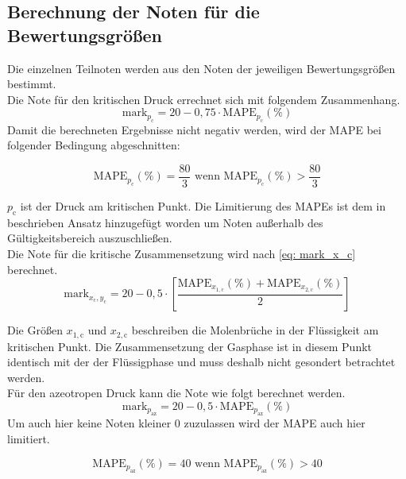\documentclass[../thesis.tex]{subfiles}
\begin{document}
\subsection{Berechnung der Noten für die Bewertungsgrößen}
Die einzelnen Teilnoten werden aus den Noten der jeweiligen Bewertungsgrößen bestimmt.
\\

Die Note für den kritischen Druck errechnet sich mit folgendem Zusammenhang.
\begin{equation}
	\mathrm{mark}_{p_{\mathrm{c}}} = 20 - 0,75 \cdot \mathrm{MAPE}_{p_\mathrm{c}}(\%)
\end{equation}
Damit die berechneten Ergebnisse nicht negativ werden, wird der MAPE bei folgender Bedingung abgeschnitten:

\begin{equation}
	\mathrm{MAPE}_{p_\mathrm{c}}(\%) = \dfrac{80}{3} \text{ wenn } \mathrm{MAPE}_{p_\mathrm{c}}(\%) > \dfrac{80}{3}
\end{equation}

$ p_\mathrm{c} $ ist der Druck am kritischen Punkt. Die Limitierung des MAPEs ist dem in \cite{jaubert2020benchmark} beschrieben Ansatz hinzugefügt worden um Noten außerhalb des Gültigkeitsbereich auszuschließen.
\\

Die Note für die kritische Zusammensetzung wird nach \autoref{eq: mark_x_c} berechnet.
\begin{equation}
\label{eq: mark_x_c}
\mathrm{mark}_{x_\mathrm{c},y_\mathrm{c}} = 20 - 0,5 \cdot \left[
	\dfrac{\mathrm{MAPE}_{x_{1,\mathrm{c}}}(\%) + \mathrm{MAPE}_{x_{2,\mathrm{c}}}(\%)}{2}
\right]
\end{equation}

Die Größen $ x_{1,\mathrm{c}} $ und $ x_{2,\mathrm{c}} $ beschreiben die Molenbrüche in der Flüssigkeit am kritischen Punkt. Die Zusammensetzung der Gasphase ist in diesem Punkt identisch mit der der Flüssigphase und muss deshalb nicht gesondert betrachtet werden.
\\

Für den azeotropen Druck kann die Note wie folgt berechnet werden.
\begin{equation}
	\mathrm{mark}_{p_{\mathrm{az}}} = 20 - 0,5 \cdot \mathrm{MAPE}_{p_\mathrm{az}}(\%)
\end{equation}
Um auch hier keine Noten kleiner 0 zuzulassen wird der MAPE auch hier limitiert.

\begin{equation}
	\label{eq: pheq_x_lim}
	\mathrm{MAPE}_{p_\mathrm{az}}(\%) = 40 \text{ wenn } \mathrm{MAPE}_{p_\mathrm{az}}(\%) > 40
\end{equation}
\end{document}
